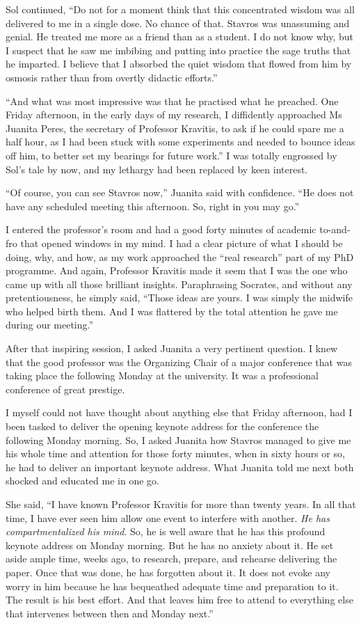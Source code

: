 \documentclass[
  a4paper,
]{article}
\begin{document}
Sol continued, ``Do not for a moment think that this concentrated wisdom
was all delivered to me in a single dose. No chance of that. Stavros was
unassuming and genial. He treated me more as a friend than as a student.
I do not know why, but I suspect that he saw me imbibing and putting
into practice the sage truths that he imparted. I believe that I
absorbed the quiet wisdom that flowed from him by osmosis rather than
from overtly didactic efforts.''

``And what was most impressive was that he practised what he preached.
One Friday afternoon, in the early days of my research, I diffidently
approached Ms Juanita Peres, the secretary of Professor Kravitis, to ask
if he could spare me a half hour, as I had been stuck with some
experiments and needed to bounce ideas off him, to better set my
bearings for future work.'' I was totally engrossed by Sol's tale by
now, and my lethargy had been replaced by keen interest.

``Of course, you can see Stavros now,'' Juanita said with confidence.
``He does not have any scheduled meeting this afternoon. So, right in
you may go.''

I entered the professor's room and had a good forty minutes of academic
to-and-fro that opened windows in my mind. I had a clear picture of what
I should be doing, why, and how, as my work approached the ``real
research'' part of my PhD programme. And again, Professor Kravitis made
it seem that I was the one who came up with all those brilliant
insights. Paraphrasing Socrates, and without any pretentiousness, he
simply said, ``Those ideas are yours. I was simply the midwife who
helped birth them. And I was flattered by the total attention he gave me
during our meeting.''

After that inspiring session, I asked Juanita a very pertinent question.
I knew that the good professor was the Organizing Chair of a major
conference that was taking place the following Monday at the university.
It was a professional conference of great prestige.

I myself could not have thought about anything else that Friday
afternoon, had I been tasked to deliver the opening keynote address for
the conference the following Monday morning. So, I asked Juanita how
Stavros managed to give me his whole time and attention for those forty
minutes, when in sixty hours or so, he had to deliver an important
keynote address. What Juanita told me next both shocked and educated me
in one go.

She said, ``I have known Professor Kravitis for more than twenty years.
In all that time, I have ever seen him allow one event to interfere with
another. \emph{He has compartmentalized his mind}. So, he is well aware
that he has this profound keynote address on Monday morning. But he has
no anxiety about it. He set aside ample time, weeks ago, to research,
prepare, and rehearse delivering the paper. Once that was done, he has
forgotten about it. It does not evoke any worry in him because he has
bequeathed adequate time and preparation to it. The result is his best
effort. And that leaves him free to attend to everything else that
intervenes between then and Monday next.''
\end{document}
